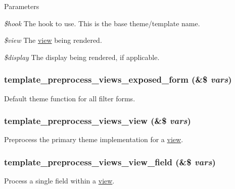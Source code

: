 \begin{DoxyParams}{Parameters}
\item[{\em \$hook}]The hook to use. This is the base theme/template name. \item[{\em \$view}]The \hyperlink{classview}{view} being rendered. \item[{\em \$display}]The display being rendered, if applicable. \end{DoxyParams}
\hypertarget{views_2theme_2theme_8inc_a512315c0c9812618259dbc4f0f827efc}{
\subsubsection[{template\_\-preprocess\_\-views\_\-exposed\_\-form}]{\setlength{\rightskip}{0pt plus 5cm}template\_\-preprocess\_\-views\_\-exposed\_\-form (\&\$ {\em vars})}}
\label{views_2theme_2theme_8inc_a512315c0c9812618259dbc4f0f827efc}
Default theme function for all filter forms. \hypertarget{views_2theme_2theme_8inc_a9390b0a0ab9315839031fadfc73df433}{
\subsubsection[{template\_\-preprocess\_\-views\_\-view}]{\setlength{\rightskip}{0pt plus 5cm}template\_\-preprocess\_\-views\_\-view (\&\$ {\em vars})}}
\label{views_2theme_2theme_8inc_a9390b0a0ab9315839031fadfc73df433}
Preprocess the primary theme implementation for a \hyperlink{classview}{view}. \hypertarget{views_2theme_2theme_8inc_a182621c56fc066ed50344ee82c900218}{
\subsubsection[{template\_\-preprocess\_\-views\_\-view\_\-field}]{\setlength{\rightskip}{0pt plus 5cm}template\_\-preprocess\_\-views\_\-view\_\-field (\&\$ {\em vars})}}
\label{views_2theme_2theme_8inc_a182621c56fc066ed50344ee82c900218}
Process a single field within a \hyperlink{classview}{view}.

